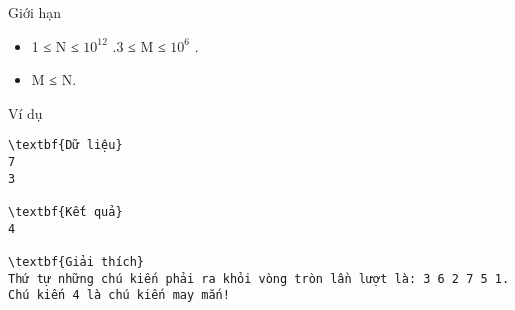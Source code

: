 Giới hạn
\begin{itemize}
	\item     1 ≤ N ≤ $10^{12}$    .3 ≤ M ≤ $10^{6}$    .   
	\item     M ≤ N.   
\end{itemize}
Ví dụ
\begin{verbatim}
\textbf{Dữ liệu}
7 
3

\textbf{Kết quả}
4

\textbf{Giải thích}
Thứ tự những chú kiến phải ra khỏi vòng tròn lần lượt là: 3 6 2 7 5 1.
Chú kiến 4 là chú kiến may mắn!
\end{verbatim}